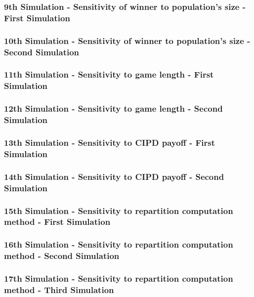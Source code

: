 \documentclass[12pt]{article}
\begin{document}
\subsubsection{9th Simulation - Sensitivity of winner to population's size - First Simulation}

\subsubsection{10th Simulation - Sensitivity of winner to population's size - Second Simulation}

\subsubsection{11th Simulation - Sensitivity to game length - First Simulation}

\subsubsection{12th Simulation - Sensitivity to game length - Second Simulation}

\subsubsection{13th Simulation - Sensitivity to CIPD payoff - First Simulation}

\subsubsection{14th Simulation - Sensitivity to CIPD payoff - Second Simulation}

\subsubsection{15th Simulation - Sensitivity to repartition computation method - First Simulation}

\subsubsection{16th Simulation - Sensitivity to repartition computation method - Second Simulation}

\subsubsection{17th Simulation - Sensitivity to repartition computation method - Third Simulation}
\end{document}
